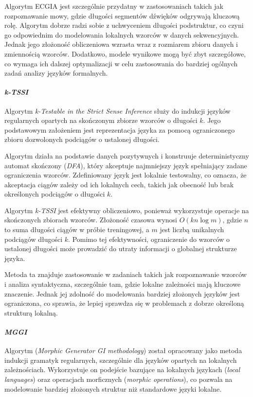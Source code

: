 Algorytm ECGIA jest szczególnie przydatny w zastosowaniach takich jak rozpoznawanie mowy, gdzie długości segmentów dźwięków odgrywają kluczową rolę. Algorytm dobrze radzi sobie z uchwyceniem długości podstruktur, co czyni go odpowiednim do modelowania lokalnych wzorców w danych sekwencyjnych. Jednak jego złożoność obliczeniowa wzrasta wraz z rozmiarem zbioru danych i zmiennością wzorców. Dodatkowo, modele wynikowe mogą być zbyt szczegółowe, co wymaga ich dalszej optymalizacji w celu zastosowania do bardziej ogólnych zadań analizy języków formalnych.  


\paragraph*{\textit{k-TSSI}}  
Algorytm \textit{k-Testable in the Strict Sense Inference} \cite{k-TSSI} służy do indukcji języków regularnych opartych na skończonym zbiorze wzorców o długości \( k \). Jego podstawowym założeniem jest reprezentacja języka za pomocą ograniczonego zbioru dozwolonych podciągów o ustalonej długości.

Algorytm działa na podstawie danych pozytywnych i konstruuje deterministyczny automat skończony (\textit{DFA}), który akceptuje najmniejszy język spełniający zadane ograniczenia wzorców. Zdefiniowany język jest lokalnie testowalny, co oznacza, że akceptacja ciągów zależy od ich lokalnych cech, takich jak obecność lub brak określonych podciągów o długości \( k \).  

Algorytm \textit{k-TSSI} jest efektywny obliczeniowo, ponieważ wykorzystuje operacje na skończonych zbiorach wzorców. Złożoność czasowa wynosi \( O(kn \log m) \), gdzie \( n \) to suma długości ciągów w próbie treningowej, a \( m \) jest liczbą unikalnych podciągów długości \( k \). Pomimo tej efektywności, ograniczenie do wzorców o ustalonej długości może prowadzić do utraty informacji o globalnej strukturze języka.  

Metoda ta znajduje zastosowanie w zadaniach takich jak rozpoznawanie wzorców i analiza syntaktyczna, szczególnie tam, gdzie lokalne zależności mają kluczowe znaczenie. Jednak jej zdolność do modelowania bardziej złożonych języków jest ograniczona, co sprawia, że lepiej sprawdza się w problemach z dobrze określoną strukturą lokalną.


\paragraph*{\textit{MGGI}}
Algorytm (\textit{Morphic Generator GI methodology}) \cite{MGGI} został opracowany jako metoda indukcji gramatyk regularnych, szczególnie dla języków opartych na lokalnych zależnościach. Wykorzystuje on podejście bazujące na lokalnych językach (\textit{local languages}) oraz operacjach morficznych (\textit{morphic operations}), co pozwala na modelowanie bardziej złożonych struktur niż standardowe języki lokalne.  

